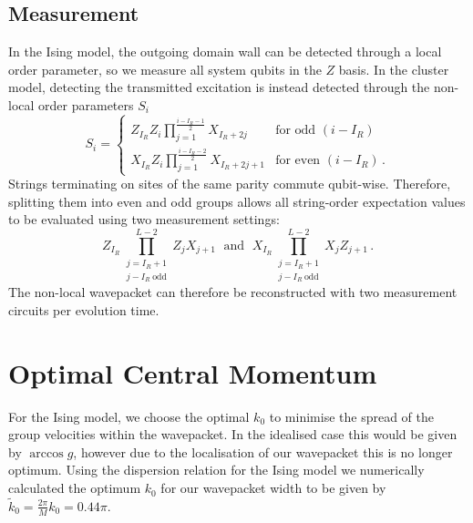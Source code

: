 \subsection{Measurement}
In the Ising model, the outgoing domain wall can be detected through a local order parameter, so we measure all system qubits in the $Z$ basis. In the cluster model, detecting the transmitted excitation is instead detected through the non-local order parameters $S_i$
\begin{equation}
S_i = \begin{cases}Z_{I_R}Z_{i}\prod_{j=1}^{\frac{i-I_R-1}{2}}X_{I_R+2j} & \text{for odd } (i-I_R)\\
    X_{I_R}Z_{i}\prod_{j=1}^{\frac{i-I_R-2}{2}}X_{I_R+2j+1} &\text{for even }  (i-I_R)\,.
    \end{cases}
    \label{eq:Si}
\end{equation}
Strings terminating on sites of the same parity commute qubit-wise. Therefore, splitting them into even and odd groups allows all string-order expectation values to be evaluated using two measurement settings:
\begin{equation}
    Z_{I_R}\prod_{\substack{j=I_R+1\\ j-I_R\ \text{odd}}}^{L-2} Z_{j}X_{j+1} \;\text{ and }\;  X_{I_R}\prod_{\substack{j=I_R+1\\ j-I_R\ \text{odd}}}^{L-2} X_{j}Z_{j+1}\,.
\end{equation}
The non-local wavepacket can therefore be reconstructed with two measurement circuits per evolution time.
\section{Optimal Central Momentum}
\label{app:optimalk}
For the Ising model, we choose the optimal $k_0$ to minimise the spread of the group velocities within the wavepacket. In the idealised case this would be given by $\arccos g$, however due to the localisation of our wavepacket this is no longer optimum. Using the dispersion relation for the Ising model we numerically calculated the optimum $k_0$ for our wavepacket width to be given by $\tilde k_0 = \frac{2\pi }{M}k_0=0.44\pi$.

